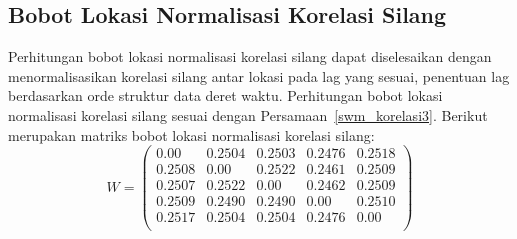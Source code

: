 \subsection{Bobot Lokasi Normalisasi Korelasi Silang}
Perhitungan bobot lokasi normalisasi korelasi silang dapat diselesaikan dengan menormalisasikan korelasi silang antar lokasi pada lag yang sesuai, penentuan lag berdasarkan orde struktur data deret waktu.
Perhitungan bobot lokasi normalisasi korelasi silang sesuai dengan Persamaan~\ref{swm_korelasi3}.
Berikut merupakan matriks bobot lokasi normalisasi korelasi silang:
\begin{equation}
    \label{swm-bobot-cross}
    W = 
    \begin{pmatrix}
        0.00 & 0.2504 & 0.2503 & 0.2476 & 0.2518 \\
        0.2508 & 0.00 & 0.2522 & 0.2461 & 0.2509 \\
        0.2507 & 0.2522 & 0.00 & 0.2462 & 0.2509 \\
        0.2509 & 0.2490 & 0.2490 & 0.00 & 0.2510 \\
        0.2517 & 0.2504 & 0.2504 & 0.2476 & 0.00 \\
    \end{pmatrix}
\end{equation}
